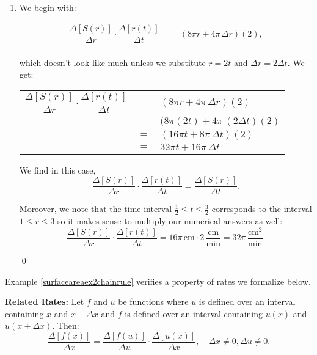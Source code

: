 \documentclass{ximera}
\begin{document}
\begin{ex}
\begin{enumerate}
                          
\item  We begin with: 
 
\[ \begin{array}{rcl}

\dfrac{\Delta[S(r)]}{\Delta r}  \cdot \dfrac{\Delta[r(t)]}{\Delta t} & = & (8 \pi r + 4 \pi \, \Delta r)(2),   \\ \end{array} \]

 which doesn't look like much unless we substitute $r = 2t$ and $\Delta r = 2 \Delta t$.  We get:

\begin{longtable}{rcl}

$\dfrac{\Delta[S(r)]}{\Delta r}  \cdot \dfrac{\Delta[r(t)]}{\Delta t}$ & $=$ & $(8 \pi r + 4 \pi \, \Delta r)(2)$   \\[10pt]
                 & $=$ & $(8 \pi (2t) + 4 \pi \ (2 \Delta t)(2)$\\[10pt]
                 & $=$ & $(16 \pi t + 8 \pi \,  \Delta t)(2)$\\[10pt]
                  & $=$ & $32 \pi t + 16 \pi \,  \Delta t$ \\ \end{longtable} 
                     
We find in this case,   \[ \dfrac{\Delta[S(r)]}{\Delta r}  \cdot \dfrac{\Delta[r(t)]}{\Delta t}   =  \dfrac{\Delta[S(r)]}{\Delta t}.\] 

Moreover, we note that the time interval $\frac{1}{2} \leq t \leq \frac{3}{2}$ corresponds to the interval $1 \leq r \leq 3$ so it makes sense to multiply our numerical answers as well: \[ \dfrac{\Delta[S(r)]}{\Delta r}  \cdot \dfrac{\Delta[r(t)]}{\Delta t} = 16 \pi \, \text{cm} \cdot 2 \, \frac{\text{cm}}{\text{min}} = 32 \pi \, \frac{\text{cm}^2}{\text{min}}.\]

\hfill \qed
	 
\end{enumerate}


\end{ex}

Example \ref{surfaceareaex2chainrule} verifies a property of rates we formalize below.

\medskip

\colorbox{ResultColor}{\bbm

\begin{thm}\label{relatedratesaroc} \textbf{Related Rates:} 
Let $f$ and $u$ be functions where $u$ is defined over an interval containing $x$ and $x+\Delta x$ and $f$ is defined over an interval containing $u(x)$ and $u(x + \Delta x)$.  Then:
\[ \dfrac{ \Delta[f(x)]}{\Delta x} =  \dfrac{ \Delta[f(u)]}{\Delta u}  \cdot  \dfrac{ \Delta[u(x)]}{\Delta x}, \quad \Delta x \neq 0,  \Delta u  \neq 0. \]

\end{thm}
\ebm}
\end{document}
